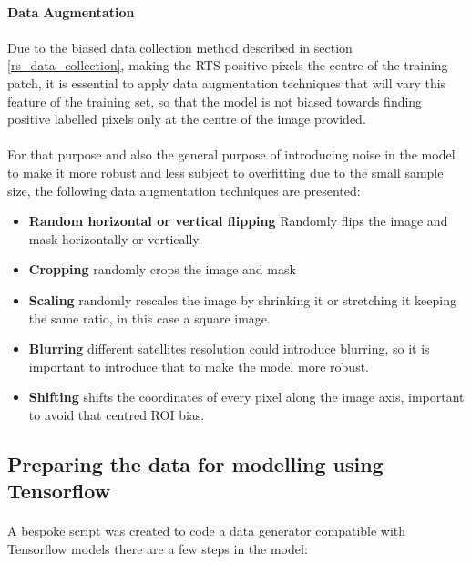 \paragraph{Data Augmentation} \label{img_aug}
\paragraph{}
Due to the biased data collection method described in section \ref{rs_data_collection}, making the \gls{RTS} positive pixels the centre of the training patch, it is essential to apply data augmentation techniques that will vary this feature of the training set, so that the model is not biased towards finding positive labelled pixels only at the centre of the image provided. 
\paragraph{}
For that purpose and also the general purpose of introducing noise in the model to make it more robust and less subject to overfitting due to the small sample size, the following data augmentation techniques are presented:

    \begin{itemize}
        \item \textbf{Random horizontal or vertical flipping} Randomly flips the image and mask horizontally or vertically.
        \item \textbf{Cropping} randomly crops the image and mask
        \item \textbf{Scaling} randomly rescales the image by shrinking it or stretching it keeping the same ratio, in this case a square image.
        \item \textbf{Blurring} different satellites resolution could introduce blurring, so it is important to introduce that to make the model more robust.
        \item \textbf{Shifting} shifts the coordinates of every pixel along the image axis, important to avoid that centred \gls{ROI} bias.
    \end{itemize}

\subsection{Preparing the data for modelling using Tensorflow} \label{tf_dataprep}
\paragraph{}
A bespoke script was created to code a data generator compatible with Tensorflow models there are a few steps in the model:

